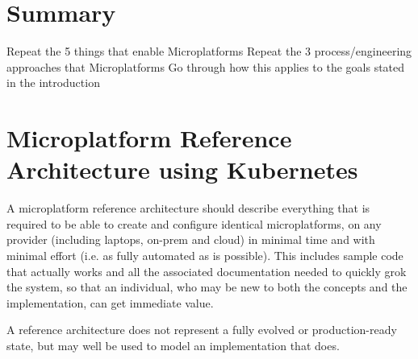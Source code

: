\documentclass[reprint,amsmath,amssymb,aps]{revtex4-1}
\begin{document}
\section{\label{sec:summary}Summary}

Repeat the 5 things that enable Microplatforms
Repeat the 3 process/engineering approaches that Microplatforms 
Go through how this applies to the goals stated in the introduction

\newpage
\clearpage
\appendix
\section{\label{sec:architecture}Microplatform Reference Architecture using Kubernetes}

A microplatform reference architecture should describe everything that is required to be able to create and configure identical microplatforms, on any provider (including laptops, on-prem and cloud) in minimal time and with minimal effort (i.e. as fully automated as is possible). This includes sample code that actually works and all the associated documentation needed to quickly grok the system, so that an individual, who may be new to both the concepts and the implementation, can get immediate value.

A reference architecture does not represent a fully evolved or production-ready state, but may well be used to model an implementation that does.



\end{document}
